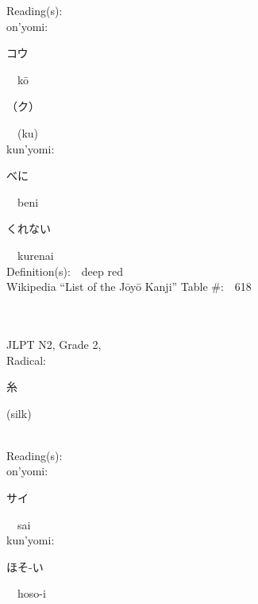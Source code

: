 \begin{multicols}{2}
Reading(s):\ \ \\
{\hspace*{1em}}on'yomi:\ \ \\
{\hspace*{2em}}{\begin{CJK}{UTF8}{min} コウ \end{CJK}}\ \ k\=o\ \ \\
{\hspace*{2em}}{\begin{CJK}{UTF8}{min} （ク） \end{CJK}}\ \ (ku)\ \ \\
{\hspace*{1em}}kun'yomi:\ \ \\
{\hspace*{2em}}{\begin{CJK}{UTF8}{min} べに \end{CJK}}\ \ beni\ \ \\
{\hspace*{2em}}{\begin{CJK}{UTF8}{min} くれない \end{CJK}}\ \ kurenai\ \ \\
Definition(s):\ \ deep red \\
Wikipedia ``List of the J\=oy\=o Kanji'' Table \#:\ \ 618 \\
\ \ \\
{\fontsize{34pt}{40pt}  }\ \ \\  %
{JLPT N2, Grade 2, \\Radical:\ \ {\begin{CJK}{UTF8}{min} 糸 \end{CJK}} (silk) } \\
Reading(s):\ \ \\
{\hspace*{1em}}on'yomi:\ \ \\
{\hspace*{2em}}{\begin{CJK}{UTF8}{min} サイ \end{CJK}}\ \ sai\ \ \\
{\hspace*{1em}}kun'yomi:\ \ \\
{\hspace*{2em}}{\begin{CJK}{UTF8}{min} ほそ-い \end{CJK}}\ \ hoso-i\ \ \\

\end{multicols}
